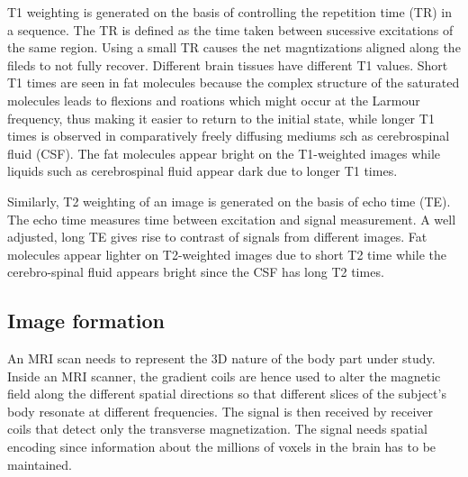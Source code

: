 \documentclass[msthesis.tex]{subfiles}
\begin{document}
T1 weighting is generated on the basis of controlling the repetition time (TR) in a sequence. The TR is defined as the time taken between sucessive excitations of the same region. Using a small TR causes the net magntizations aligned along the fileds to not fully recover. Different brain tissues have different T1 values.  Short T1 times are seen in fat molecules because the complex structure of the saturated molecules leads to flexions and roations which might occur at the Larmour frequency, thus making it easier to return to the initial state, while longer T1 times is observed in comparatively freely diffusing mediums sch as cerebrospinal fluid (CSF). The fat molecules appear bright on the T1-weighted images while liquids such as cerebrospinal fluid appear dark due to longer T1 times.

Similarly, T2 weighting of an image is generated on the basis of echo time (TE). The echo time measures time between excitation and signal measurement. A well adjusted, long TE gives rise to contrast of signals from different images. Fat molecules appear lighter on T2-weighted images due to short T2 time while the cerebro-spinal fluid appears bright since the CSF has long T2 times.


\subsection{Image formation}

An MRI scan needs to represent the 3D nature of the body part under study. Inside an MRI scanner, the gradient coils are hence used to alter the magnetic field along the different spatial directions so that different slices of the subject’s body resonate at different frequencies. The signal is then received by receiver coils that detect only the transverse magnetization. The signal needs spatial encoding since information about the millions of voxels in the brain has to be maintained.
\end{document}
